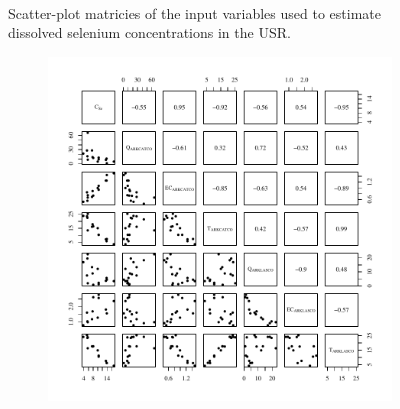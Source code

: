 \begin{landscape}
\begin{figure}
\begin{subfigure}{0.7\textwidth}
		\end{subfigure}\\
		\caption{Scatter-plot matricies of the input variables used to estimate dissolved selenium concentrations in the USR.}
	\end{figure}
\end{landscape}
\subfiguretop


\subfiguretop
\begin{landscape}
	\begin{figure}
		\begin{subfigure}{0.7\textwidth}
			\centering
			\includegraphics[width=\tableCustomSize]{"Figures/Results_USR/Stochastic/Conc Model Full PairsU163"}
		\end{subfigure}%
		\begin{subfigure}{0.7\textwidth}
			\centering

\end{subfigure}
\end{figure}
\end{landscape}
